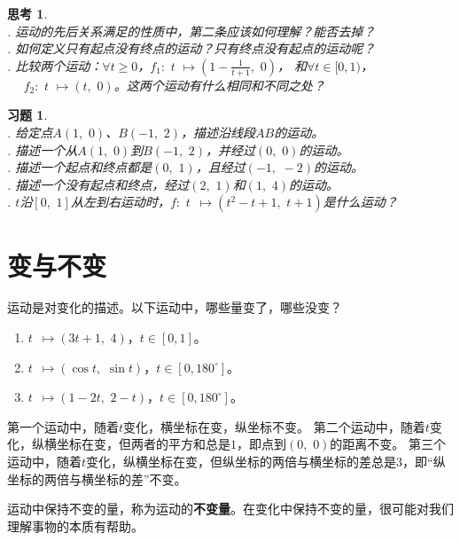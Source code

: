 \documentclass[12pt,UTF8]{ctexbook}
\newtheorem{sk}{思考}[section]
\newtheorem{xt}{习题}[section]
\begin{document}
\begin{sk}
    \mbox{} \\
    . 运动的先后关系满足的性质中，第二条应该如何理解？能否去掉？\\
    . 如何定义只有起点没有终点的运动？只有终点没有起点的运动呢？\\
    . 比较两个运动：$\forall t \geqslant 0$，$f_1:\,\, t \,\, \mapsto (1 - \frac{1}{t+1}, \,\, 0)$，
    和$\forall t \in [0, 1)$，\\
    \indent $\quad \,\, f_2:\,\, t \,\, \mapsto (t, \,\,0)$。这两个运动有什么相同和不同之处？
\end{sk}

\begin{xt}
    \mbox{} \\
    . 给定点$A(1,\,\,0)$、$B(-1,\,\,2)$，描述沿线段$AB$的运动。\\
    . 描述一个从$A(1,\,\,0)$到$B(-1,\,\,2)$，并经过$(0,\,\,0)$的运动。\\
    . 描述一个起点和终点都是$(0, \,\, 1)$，且经过$(-1,\,\, -2)$的运动。\\
    . 描述一个没有起点和终点，经过$(2,\,\, 1)$和$(1,\,\, 4)$的运动。\\
    . $t$沿$[0,\,\,1]$从左到右运动时，$f: \,\, t \,\,\, \mapsto (t^2 - t + 1, \,\, t + 1)$是什么运动？
\end{xt}

\section{变与不变}
运动是对变化的描述。以下运动中，哪些量变了，哪些没变？
\begin{enumerate}
    \item $ t \,\,\,\mapsto (3t+1, \,\, 4)$，$t\in[0,1]$。
    \item $ t \,\,\,\mapsto (\cos{t}, \,\, \sin{t})$，$t\in[0,180^\circ]$。
    \item $ t \,\,\,\mapsto (1 - 2t, \,\, 2 - t)$，$t\in[0,180^\circ]$。
\end{enumerate}
第一个运动中，随着$t$变化，横坐标在变，纵坐标不变。
第二个运动中，随着$t$变化，纵横坐标在变，但两者的平方和总是$1$，即点到$(0,\,\,0)$的距离不变。
第三个运动中，随着$t$变化，纵横坐标在变，但纵坐标的两倍与横坐标的差总是$3$，即“纵坐标的两倍与横坐标的差”不变。

运动中保持不变的量，称为运动的\textbf{不变量}。在变化中保持不变的量，很可能对我们理解事物的本质有帮助。
\end{document}
